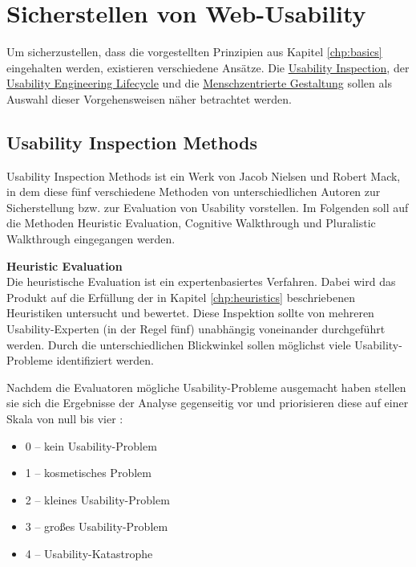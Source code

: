 \documentclass[utf8,biblatex]{lni}
\begin{document}
\clearpage



\section{Sicherstellen von Web-Usability}
Um sicherzustellen, dass die vorgestellten Prinzipien aus Kapitel \ref{chp:basics} eingehalten werden, existieren verschiedene Ansätze. Die \hyperref[chp:ui]{Usability Inspection}, der \hyperref[chp:uel]{Usability Engineering Lifecycle} und die \hyperref[chp:mg]{Menschzentrierte Gestaltung} sollen als Auswahl dieser Vorgehensweisen näher betrachtet werden.


\subsection{Usability Inspection Methods} \label{chp:ui}
Usability Inspection Methods ist ein Werk von Jacob Nielsen und Robert Mack, in dem diese fünf verschiedene Methoden von unterschiedlichen Autoren zur Sicherstellung bzw. zur Evaluation von Usability vorstellen. Im Folgenden soll auf die Methoden Heuristic Evaluation, Cognitive Walkthrough und Pluralistic Walkthrough eingegangen werden.

\textbf{Heuristic Evaluation}\label{sec:heueva}\\
Die heuristische Evaluation ist ein expertenbasiertes Verfahren. Dabei wird das Produkt auf die Erfüllung der in Kapitel \ref{chp:heuristics} beschriebenen Heuristiken untersucht und bewertet. Diese Inspektion sollte von mehreren Usability-Experten (in der Regel fünf) unabhängig voneinander durchgeführt werden. Durch die unterschiedlichen Blickwinkel sollen möglichst viele Usability-Probleme identifiziert werden.

Nachdem die Evaluatoren mögliche Usability-Probleme ausgemacht haben stellen sie sich die Ergebnisse der Analyse gegenseitig vor und priorisieren diese auf einer Skala von null bis vier \cite[49]{Nielsen.1994b}:

\begin{itemize}
  \item 0 – kein Usability-Problem
  \item 1 – kosmetisches Problem
  \item 2 – kleines Usability-Problem
  \item 3 – großes Usability-Problem
  \item 4 – Usability-Katastrophe
\end{itemize}
\end{document}
